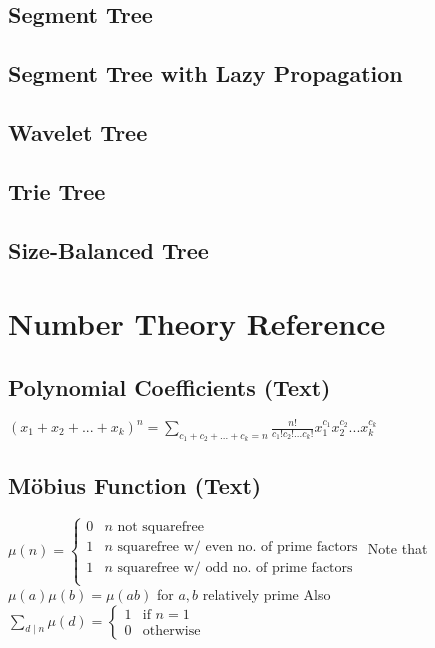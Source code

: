 \documentclass[10pt]{extarticle}
\begin{document}
\begin{multicols*}{3}
\subsection{Segment Tree} %


\subsection{Segment Tree with Lazy Propagation} %


\subsection{Wavelet Tree} %


\subsection{Trie Tree} %


\subsection{Size-Balanced Tree}


\section{Number Theory Reference}
\subsection{Polynomial Coefficients (Text)} %
$(x_1 + x_2 + ... + x_k)^n = \sum_{c_1 + c_2 + ... + c_k = n}
\frac{n!}{c_1! c_2! ... c_k!} x_1^{c_1} x_2^{c_2} ... x_k^{c_k}$

\subsection{M\"obius Function (Text)} %
$\mu(n) = \begin{cases}
0 & \text{$n$ not squarefree} \\
1 & \text{$n$ squarefree w/ even no. of prime factors} \\
1 & \text{$n$ squarefree w/ odd no. of prime factors} \\
\end{cases}$
Note that $\mu(a) \mu(b) = \mu(ab)$ for $a, b$ relatively prime
Also $\sum_{d \mid n} \mu(d) = \begin{cases} 1 & \text{if $n = 1$} \\
0 & \text{otherwise} \end{cases}$


\end{multicols*}
\end{document}
